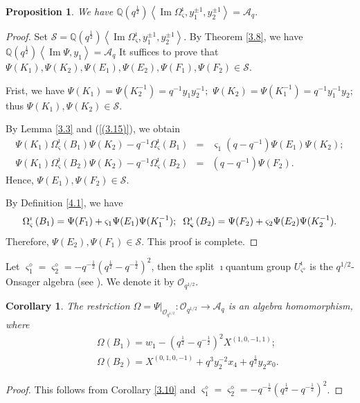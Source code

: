 \documentclass[reqno,11pt]{amsart}
\numberwithin{equation}{section}
\newtheorem{proposition}[theorem]{Proposition}
\newtheorem{corollary}[theorem]{Corollary}
\begin{document}
\begin{proposition}
 We have $\mathbb{Q}(q^{\frac{1}{2}})\left\langle\operatorname{Im} \Omega_{\varsigma}^{\imath}, y_1^{ \pm 1}, y_2^{ \pm 1}\right\rangle=\mathcal{A}_q.$
\end{proposition}
\begin{proof}
	Set $\mathcal{S}=\mathbb{Q}(q^{\frac{1}{2}})\left\langle\operatorname{Im}
	\Omega_{\boldsymbol{\varsigma}}^{\imath}, y_1^{ \pm 1}, y_2^{ \pm 1}\right\rangle$. By Theorem \ref{3.8}, we have $\mathbb{Q}(q^{\frac{1}{2}})\left\langle\operatorname{Im} \Psi, y_1\right\rangle=\mathcal{A}_q$ It suffices to prove that $\Psi(K_1),\Psi(K_2),\Psi(E_1),\Psi(E_2),\Psi(F_1),\Psi(F_2) \in \mathcal{S}$.
	
Frist, we have $\Psi(K_1)=\Psi(K_2^{-1})=q^{-1} y_1 y_2^{-1};$ $ \Psi(K_2)=\Psi(K_1^{-1})=q^{-1} y_1^{-1} y_2;$ thus $\Psi(K_1), \Psi(K_2) \in \mathcal{S}.$

By Lemma \ref{3.3} and (\ref{(3.15)}), we obtain
\begin{eqnarray*}
	\Psi(K_1)\Omega_{\varsigma}^{\imath}\left(B_1\right) \Psi(K_2)-q^{-1} \Omega_{\varsigma}^{\imath}\left(B_1\right)&=& \varsigma_1\left(q-q^{-1}\right)\Psi(E_1)\Psi(K_2); \\
	\Psi(K_1) \Omega_{\varsigma}^{\imath}\left(B_2\right) \Psi(K_2)-q^{-1} \Omega_{\varsigma}^{\imath}\left(B_2\right)&=&\left(q-q^{-1}\right)\Psi(F_2) .
\end{eqnarray*}
Hence, $\Psi(E_1), \Psi(F_2) \in \mathcal{S}.$

By Definition \ref{4.1}, we have
	\begin{eqnarray*}
		\Omega_{\varsigma}^{\imath}\left(B_1\right)=\Psi(F_1)+ \varsigma_1\Psi(E_1)\Psi(K_1^{-1}) ;\hspace{0.2cm}
		\Omega_{\boldsymbol{\varsigma}}^{\imath}\left(B_2\right)=\Psi(F_2)+\varsigma_2\Psi(E_2)\Psi(K_2^{-1}) .
	\end{eqnarray*}
Therefore, $\Psi(E_2), \Psi(F_1) \in \mathcal{S}.$ This proof is complete.	
\end{proof}

 Let $\varsigma_1^{\diamond}=\varsigma_2^{\diamond}=-q^{-\frac{1}{2}}\left(q^{\frac{1}{2}}-q^{-\frac{1}{2}}\right)^2$, then the split $\imath$quantum group $U_{\varsigma^{\diamond}}^{\imath}$ is the $q^{1/2}$-Onsager algebra (see \cite[Remark~2.6]{LRZ25}). We denote it by $\mathcal{O}_{q^{1/2}}$.

\begin{corollary}
 The restriction $\Omega=\left.\Psi\right|_{\mathcal{O}_{q^{1/2}}}: \mathcal{O}_{q^{1/2}} \longrightarrow \mathcal{A}_q$ is an algebra homomorphism, where
\begin{eqnarray*}
	 &&\Omega\left(B_1\right)=w_1-\left(q^{\frac{1}{2}}-q^{-\frac{1}{2}}\right)^2 X^{(1,0,-1,1)}; \\
	 &&\Omega\left(B_2\right)=X^{(0,1,0,-1)}+q^3 y_2^{-2} x_4+q^{\frac{1}{2}} y_2 x_0 .
\end{eqnarray*}
\end{corollary}
\begin{proof}
	 This follows from Corollary \ref{3.10} and $\varsigma_1^{\diamond}=\varsigma_2^{\diamond}=-q^{-\frac{1}{2}}\left(q^{\frac{1}{2}}-q^{-\frac{1}{2}}\right)^2$.
\end{proof}
\end{document}
